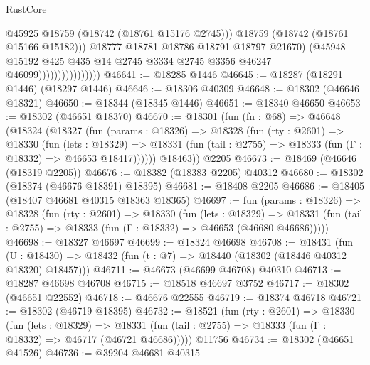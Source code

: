 \begin{lexlean}{RustCore}
\begin{coremodule}
                                        @45925
                                        @18759
                                        (@18742 (@18761 @15176 @2745)))
                                      @18759
                                      (@18742 (@18761 @15166 @15182)))
                                    @18777
                                    @18781
                                    @18786
                                    @18791
                                    @18797
                                    @21670)
                                  (@45948
                                    @15192
                                    @425
                                    @435
                                    @14
                                    @2745
                                    @3334
                                    @2745
                                    @3356
                                    @46247
                                    @46099))))))))))))))))
@46641 := @18285 @1446
@46645 := @18287 (@18291 @1446) (@18297 @1446)
@46646 := @18306 @40309
@46648 := @18302 (@46646 @18321)
@46650 := @18344 (@18345 @1446)
@46651 := @18340 @46650
@46653 := @18302 (@46651 @18370)
@46670 := @18301
    (fun (fn : @68) =>
    @46648
      (@18324
        (@18327
          (fun (params : @18326) =>
          @18328
            (fun (rty : @2601) =>
            @18330
              (fun (lets : @18329) =>
              @18331 (fun (tail : @2755) => @18333 (fun (Γ : @18332) => @46653 @18417))))))
        @18463))
    @2205
@46673 := @18469 (@46646 (@18319 @2205))
@46676 := @18382 (@18383 @2205) @40312
@46680 := @18302 (@18374 (@46676 @18391) @18395)
@46681 := @18408 @2205
@46686 := @18405 (@18407 @46681 @40315 @18363 @18365)
@46697 := fun (params : @18326) =>
  @18328
    (fun (rty : @2601) =>
    @18330
      (fun (lets : @18329) =>
      @18331 (fun (tail : @2755) => @18333 (fun (Γ : @18332) => @46653 (@46680 @46686)))))
@46698 := @18327 @46697
@46699 := @18324 @46698
@46708 := @18431
    (fun (U : @18430) => @18432 (fun (t : @7) => @18440 (@18302 (@18446 @40312 @18320) @18457)))
@46711 := @46673 (@46699 @46708) @40310
@46713 := @18287 @46698 @46708
@46715 := @18518 @46697 @3752
@46717 := @18302 (@46651 @22552)
@46718 := @46676 @22555
@46719 := @18374 @46718
@46721 := @18302 (@46719 @18395)
@46732 := @18521
    (fun (rty : @2601) =>
    @18330
      (fun (lets : @18329) =>
      @18331 (fun (tail : @2755) => @18333 (fun (Γ : @18332) => @46717 (@46721 @46686)))))
    @11756
@46734 := @18302 (@46651 @41526)
@46736 := @39204 @46681 @40315

\end{coremodule}
\end{lexlean}
